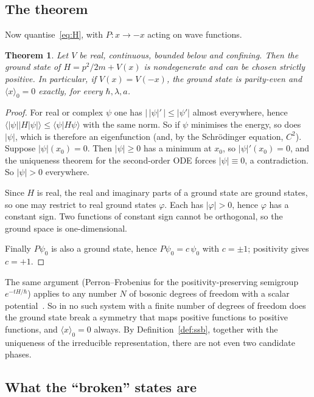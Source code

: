 \documentclass[11pt,a4paper]{article}
\newtheorem{theorem}{Theorem}
\theoremstyle{definition}
\theoremstyle{remark}
\newcommand{\hb}{\hbar}
\newcommand{\braket}[2]{\langle #1|#2\rangle}
\newcommand{\ev}[1]{\langle #1\rangle}
\begin{document}
\subsection{The theorem}

Now quantise~\eqref{eq:H}, with $P:x\to-x$ acting on wave functions.

\begin{theorem}\label{thm:nodeless}
Let $V$ be real, continuous, bounded below and confining. Then the ground state of
$H=p^2/2m+V(x)$ is nondegenerate and can be chosen strictly positive. In particular, if
$V(x)=V(-x)$, the ground state is parity-even and $\ev{x}_0=0$ exactly, for every $\hb,\lambda,a$.
\end{theorem}

\begin{proof}
For real or complex $\psi$ one has $\bigl|\,|\psi|'\,\bigr|\le|\psi'|$ almost everywhere, hence
$\braket{|\psi|}{H|\psi|}\le\braket{\psi}{H\psi}$ with the same norm. So if $\psi$ minimises the energy, so does
$|\psi|$, which is therefore an eigenfunction (and, by the Schr\"odinger equation, $C^2$). Suppose
$|\psi|(x_0)=0$. Then $|\psi|\ge0$ has a minimum at $x_0$, so $|\psi|'(x_0)=0$, and the uniqueness theorem for
the second-order ODE forces $|\psi|\equiv0$, a contradiction. So $|\psi|>0$ everywhere.

Since $H$ is real, the real and imaginary parts of a ground state are ground states, so one may restrict to real
ground states $\varphi$. Each has $|\varphi|>0$, hence $\varphi$ has a constant sign. Two functions of constant
sign cannot be orthogonal, so the ground space is one-dimensional.

Finally $P\psi_0$ is also a ground state, hence $P\psi_0=c\,\psi_0$ with $c=\pm1$; positivity gives $c=+1$.
\end{proof}

The same argument (Perron--Frobenius for the positivity-preserving semigroup $e^{-tH/\hb}$) applies to any
number $N$ of bosonic degrees of freedom with a scalar potential~\cite{ReedSimon4}. So in no such system with
a finite number of degrees of freedom does the ground state break a symmetry that maps positive functions to
positive functions, and $\ev{x}_0=0$ always. By Definition~\ref{def:ssb}, together with the uniqueness of the
irreducible representation, there are not even two candidate phases.

\subsection{What the ``broken'' states are}
\end{document}
